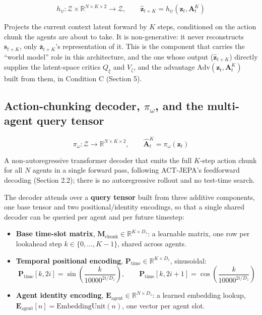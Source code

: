 \documentclass[11pt]{article}
\providecommand{\tightlist}{%
  \setlength{\itemsep}{0pt}\setlength{\parskip}{0pt}}
\begin{document}
\[h_\psi: \mathcal{Z} \times \mathbb{R}^{N \times K \times 2} \rightarrow \mathcal{Z}, \qquad \hat{\mathbf{z}}_{t+K} = h_\psi(\mathbf{z}_t, \mathbf{A}_t^K)\]

Projects the current context latent forward by \(K\) steps, conditioned on the action chunk the agents are about to take. It is non-generative: it never reconstructs \(\mathbf{s}_{t+K}\), only \(\bar{\mathbf{z}}_{t+K}\)'s representation of it. This is the component that carries the ``world model'' role in this architecture, and the one whose output (\(\hat{\mathbf{z}}_{t+K}\)) directly supplies the latent-space critics \(Q_\xi\) and \(V_\zeta\), and the advantage \(\mathrm{Adv}(\mathbf{z}_t,\mathbf{A}_t^K)\) built from them, in Condition C (Section 5).

\hypertarget{action-chunking-decoder-pi_omega-and-the-multi-agent-query-tensor}{%
\subsection{\texorpdfstring{Action-chunking decoder, \(\pi_\omega\), and the multi-agent query tensor}{Action-chunking decoder, pi omega, and the multi-agent query tensor}}\label{action-chunking-decoder-pi_omega-and-the-multi-agent-query-tensor}}

\[\pi_\omega: \mathcal{Z} \rightarrow \mathbb{R}^{N \times K \times 2}, \qquad \hat{\mathbf{A}}_t^K = \pi_\omega(\mathbf{z}_t)\]

A non-autoregressive transformer decoder that emits the full \(K\)-step action chunk for all \(N\) agents in a single forward pass, following ACT-JEPA's feedforward decoding (Section 2.2); there is no autoregressive rollout and no test-time search.

The decoder attends over a \textbf{query tensor} built from three additive components, one base tensor and two positional/identity encodings, so that a single shared decoder can be queried per agent and per future timestep:

\begin{itemize}
\tightlist
\item
  \textbf{Base time-slot matrix}, \(\mathbf{M}_{\text{chunk}} \in \mathbb{R}^{K \times D_z}\): a learnable matrix, one row per lookahead step \(k \in \{0, \dots, K-1\}\), shared across agents.
\item
  \textbf{Temporal positional encoding}, \(\mathbf{P}_{\text{time}} \in \mathbb{R}^{K \times D_z}\), sinusoidal:
  \[\mathbf{P}_{\text{time}}[k, 2i] = \sin\!\left(\frac{k}{10000^{2i/D_z}}\right), \qquad \mathbf{P}_{\text{time}}[k, 2i+1] = \cos\!\left(\frac{k}{10000^{2i/D_z}}\right)\]
\item
  \textbf{Agent identity encoding}, \(\mathbf{E}_{\text{agent}} \in \mathbb{R}^{N \times D_z}\): a learned embedding lookup, \(\mathbf{E}_{\text{agent}}[n] = \text{EmbeddingUnit}(n)\), one vector per agent slot.
\end{itemize}
\end{document}
